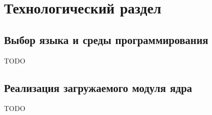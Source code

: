 \chapter{Технологический раздел}

\section{Выбор языка и среды программирования}

TODO

\section{Реализация загружаемого модуля ядра}

TODO